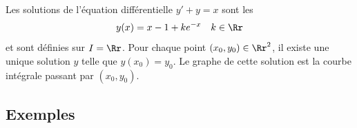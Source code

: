 \documentclass[class=report,crop=false]{standalone}
\begin{document}
\begin{exemple}
Les solutions de l'équation différentielle
$y'+y=x$ sont les
$$y(x) = x-1 + ke^{-x} \quad k \in\Rr$$
et sont définies sur $I=\Rr$.
Pour chaque point $(x_0,y_0) \in \Rr^2$, il existe une unique solution
$y$ telle que $y(x_0)=y_0$. Le graphe de cette solution
est la courbe intégrale passant par $(x_0,y_0)$.


\end{exemple}


\subsection{Exemples}
\end{document}
